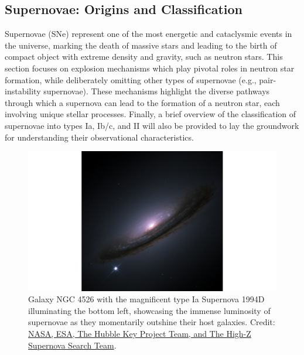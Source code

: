 \documentclass[main.tex]{subfiles}
\begin{document}
    \subsection{Supernovae: Origins and Classification}\label{sec:ch1:transients}
    Supernovae (SNe) represent one of the most energetic and cataclysmic events in the universe, marking the death of massive stars and leading to the birth of compact object with extreme density and gravity, such as neutron stars. This section focuses on explosion mechanisms which play pivotal roles in neutron star formation, while deliberately omitting other types of supernovae (e.g., pair-instability supernovae). These mechanisms highlight the diverse pathways through which a supernova can lead to the formation of a neutron star, each involving unique stellar processes. Finally, a brief overview of the classification of supernovae into types Ia, Ib/c, and II will also be provided to lay the groundwork for understanding their observational characteristics.
    \begin{figure}[t]
        \centering
        \includegraphics[scale=0.2]{figures/chapter1/SN1994D_NGC4526.png}
        \caption{Galaxy NGC 4526 with the magnificent type Ia Supernova 1994D illuminating the bottom left, showcasing the immense luminosity of supernovae as they momentarily outshine their host galaxies. Credit: \href{https://hubblesite.org/contents/media/images/1999/19/813-Image.html}{NASA, ESA, The Hubble Key Project Team, and The High-Z Supernova Search Team}.}
        \label{fig:sn1994d}
    \end{figure}
\end{document}
